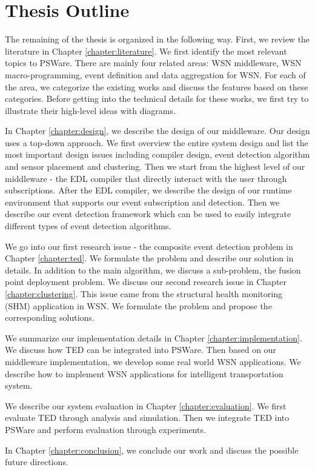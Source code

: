 \section{Thesis Outline}
\label{sec:introduction:outline}

The remaining of the thesis is organized in the following way. First, we review the literature in Chapter \ref{chapter:literature}. We first identify the most relevant topics to PSWare. There are mainly four related areas: WSN middleware, WSN macro-programming, event definition and data aggregation for WSN. For each of the area, we categorize the existing works and discuss the features based on these categories. Before getting into the technical details for these works, we first try to illustrate their high-level ideas with diagrams.

In Chapter \ref{chapter:design}, we describe the design of our middleware. Our design uses a top-down approach. We first overview the entire system design and list the most important design issues including compiler design, event detection algorithm and sensor placement and clustering. Then we start from the highest level of our middleware - the EDL compiler that directly interact with the user through subscriptions. After the EDL compiler, we describe the design of our runtime environment that supports our event subscription and detection. Then we describe our event detection framework which can be used to easily integrate different types of event detection algorithms.

We go into our first research issue - the composite event detection problem in Chapter \ref{chapter:ted}. We formulate the problem and describe our solution in details. In addition to the main algorithm, we discuss a sub-problem, the fusion point deployment problem. We discuss our second research issue in Chapter \ref{chapter:clustering}. This issue came from the structural health monitoring (SHM) application in WSN. We formulate the problem and propose the corresponding solutions.

We summarize our implementation details in Chapter \ref{chapter:implementation}. We discuss how TED can be integrated into PSWare. Then based on our middleware implementation, we develop some real world WSN applications. We describe how to implement WSN applications for intelligent transportation system.

We describe our system evaluation in Chapter \ref{chapter:evaluation}. We first evaluate TED through analysis and simulation. Then we integrate TED into PSWare and perform evaluation through experiments.

In Chapter \ref{chapter:conclusion}, we conclude our work and discuss the possible future directions.